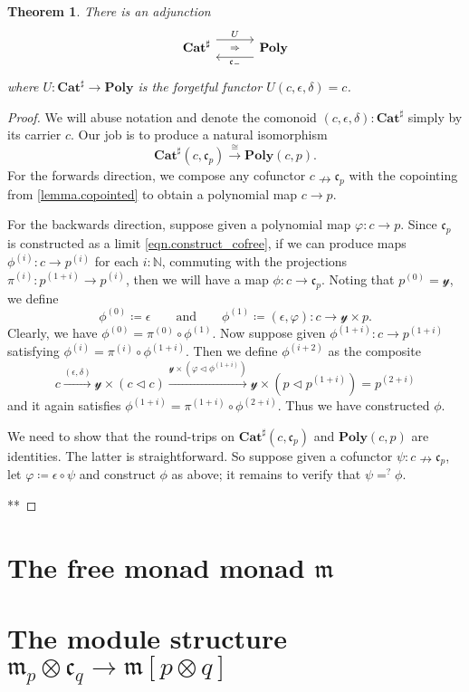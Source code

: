 \documentclass[11pt, one side, article]{memoir}
\newcommand{\adj}[5][30pt]{%
\begin{tikzcd}[ampersand replacement=\&, column sep=#1]
  #2\ar[r, shift left=7pt, "#3"]
  \ar[r, phantom, "\scriptstyle\Rightarrow"]\&
  #5\ar[l, shift left=7pt, "#4"]
\end{tikzcd}
}
\theoremstyle{definition}
\theoremstyle{plain}
\newtheorem{theorem}[definitionx]{Theorem}
\newcommand{\Cat}[1]{\mathbf{#1}}%
\newcommand{\To}[2][]{\xrightarrow[#1]{#2}}
\newcommand{\nn}{\mathbb{N}}
\newcommand{\catsharp}{\Cat{Cat}^{\sharp}}
\newcommand{\yon}{\mathcal{y}}
\newcommand{\poly}{\Cat{Poly}}
\newcommand{\tri}{\mathbin{\triangleleft}}
\newcommand{\free}{\mathfrak{m}}
\newcommand{\cofree}{\mathfrak{c}}
\newcommand{\qqand}{\qquad\text{and}\qquad}
\newcommand{\coto}{\nrightarrow}
\newcommand{\coh}[1]{^{(#1)}}
\begin{document}
\begin{theorem}
There is an adjunction
\[
\adj{\catsharp}{U}{\cofree_-}{\poly}
\]
where $U\colon\catsharp\to\poly$ is the forgetful functor $U(c,\epsilon,\delta)=c$.
\end{theorem}
\begin{proof}
We will abuse notation and denote the comonoid $(c,\epsilon,\delta):\catsharp$ simply by its carrier $c$. Our job is to produce a natural isomorphism
\[
\catsharp(c,\cofree_p)\To{\cong}\poly(c,p).
\]
For the forwards direction, we  compose any cofunctor $c\coto\cofree_p$ with the copointing from \cref{lemma.copointed} to obtain a polynomial map $c\to p$. 

For the backwards direction, suppose given a polynomial map $\varphi\colon c\to p$. Since $\cofree_p$ is constructed as a limit \eqref{eqn.construct_cofree}, if we can produce maps $\phi\coh{i}\colon c\to p\coh{i}$ for each $i:\nn$, commuting with the projections $\pi\coh{i}\colon p\coh{1+i}\to p\coh{i}$, then we will have a map $\phi\colon c\to\cofree_p$. Noting that $p\coh{0}=\yon$, we define
\[
\phi\coh{0}\coloneqq\epsilon
\qqand
\phi\coh{1}\coloneqq(\epsilon,\varphi)\colon c\to\yon\times p.
\]
Clearly, we have $\phi\coh{0}=\pi\coh{0}\circ\phi\coh{1}$. Now suppose given $\phi\coh{1+i}\colon c\to p\coh{1+i}$ satisfying $\phi\coh{i}=\pi\coh{i}\circ\phi\coh{1+i}$. Then we define $\phi\coh{i+2}$ as the composite
\[
c\To{(\epsilon,\delta)}\yon\times(c\tri c)\To{\yon\times(\varphi\tri\phi\coh{1+i})}\yon\times\left(p\tri p\coh{1+i}\right)=p\coh{2+i}
\]
and it again satisfies $\phi\coh{1+i}=\pi\coh{1+i}\circ\phi\coh{2+i}$. Thus we have constructed $\phi$.

We need to show that the round-trips on $\catsharp(c,\cofree_p)$ and $\poly(c,p)$ are identities. The latter is straightforward. So suppose given a cofunctor $\psi\colon c\coto\cofree_p$, let $\varphi\coloneqq\epsilon\circ\psi$ and construct $\phi$ as above; it remains to verify that $\psi=^?\phi$.

**
\end{proof}

\chapter{The free monad monad $\free$}

\chapter{The module structure $\free_p\otimes\cofree_q\to\free[p\otimes q]$}


\printbibliography
\end{document}
